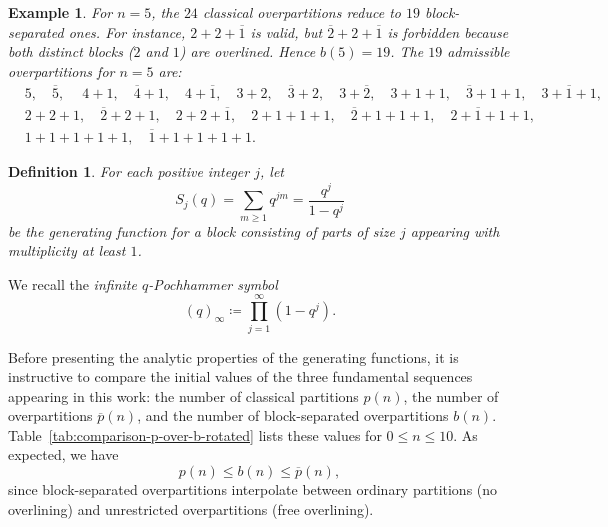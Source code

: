 \documentclass[letterpaper,12pt]{article}
\newtheorem{definition}{Definition}
\newtheorem{example}{Example}
\begin{document}
\begin{example}
For \( n = 5 \), the $24$ classical overpartitions reduce to \(19\) block-separated ones.
For instance, \(2\!+\!2\!+\!\overline{1}\) is valid, but \(\overline{2}\!+\!2\!+\!\overline{1}\) is forbidden because both distinct blocks (\(2\) and \(1\)) are overlined.
Hence \(b(5)=19\).  The   $19$ admissible overpartitions for $n=5$ are:
\[
\begin{aligned}
&5,\quad \overline{5},\quad\  4+1,\quad \overline{4}+1,\quad 4+\overline{1},\quad 3+2,\quad \overline{3}+2,\quad 3+\overline{2},\quad 3+1+1,\quad \overline{3}+1+1,\quad 3+\overline{1}+1,\\[4pt]
&2+2+1,\quad \overline{2}+2+1,\quad 2+2+\overline{1},\quad 2+1+1+1,\quad \overline{2}+1+1+1,\quad 2+\overline{1}+1+1,\\[4pt]
&1+1+1+1+1,\quad \overline{1}+1+1+1+1.
\end{aligned}
\]
 

\end{example}

\begin{definition}
For each positive integer \( j \), let
\begin{equation}
    S_j(q) = \sum_{m\ge1} q^{jm} = \frac{q^j}{1-q^j}
\end{equation}
be the generating function for a block consisting of parts of size \( j \) appearing with multiplicity at least \(1\).
\end{definition}

We recall the \emph{infinite $q$-Pochhammer symbol}
\begin{equation}\label{eq:qpoch}
(q)_\infty
  \coloneqq
  \prod_{j=1}^{\infty} (1 - q^j).
\end{equation}

Before presenting the analytic properties of the generating functions, it is
instructive to compare the initial values of the three fundamental sequences
appearing in this work: the number of classical partitions $p(n)$, the number
of overpartitions $\overline{p}(n)$, and the number of block-separated
overpartitions $b(n)$.  
Table~\ref{tab:comparison-p-over-b-rotated} lists these values for
$0 \le n \le 10$.  
As expected, we have
\[
p(n) \le b(n) \le \overline{p}(n),
\]
since block-separated overpartitions interpolate between ordinary partitions
(no overlining) and unrestricted overpartitions (free overlining).  
\end{document}
